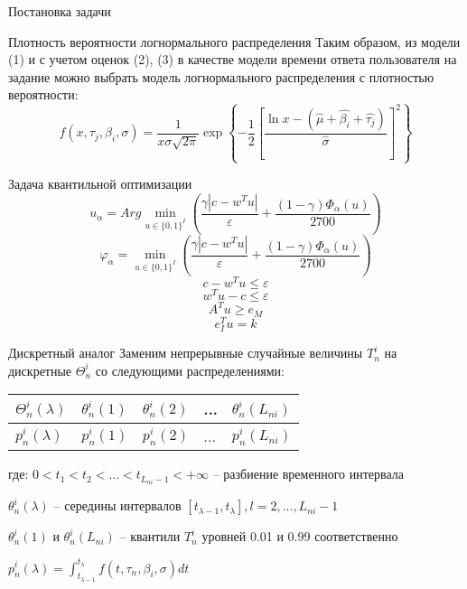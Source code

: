\documentclass[aspectratio=169]{beamer}
\begin{document}
    \begin{frame}{Постановка задачи}
        \begin{block}{Плотность вероятности логнормального распределения}
            Таким образом, из модели (1) и с учетом оценок (2), (3) в качестве модели времени ответа пользователя на задание можно выбрать модель логнормального распределения с плотностью вероятности:
            \begin{equation}
                f(x,\tau_j,\beta_i,\sigma) = \dfrac{1}{x\sigma \sqrt{2\pi}}\exp \left\{ -\dfrac{1}{2} \left[ \dfrac{\ln x - (\hat{\mu} + \hat{\beta_i} + \hat{\tau_j})}{\hat{\sigma}} \right]^2 \right\}
            \end{equation}
        \end{block}
    \end{frame}

    \begin{frame}{Задача квантильной оптимизации}
        $$u_\alpha = Arg\min_{u\in\{0, 1\}^I}\left(\frac{\gamma\left|c-w^T u\right|}{\varepsilon} + \frac{(1-\gamma)\Phi_\alpha(u)}{2700}\right)$$
        $$\varphi_\alpha = \min_{u\in\{0, 1\}^I}\left(\frac{\gamma\left|c-w^T u\right|}{\varepsilon} + \frac{(1-\gamma)\Phi_\alpha(u)}{2700}\right)$$
        $$c-w^T u\leq\varepsilon$$
        $$w^T u-c\leq\varepsilon$$
        $$A^T u\geq e_M$$
        $$e_I^T u=k$$
    \end{frame}
    
    \begin{frame}{Дискретный аналог}
        Заменим непрерывные случайные величины $T_n^i$ на дискретные $\Theta_n^i$ со следующими распределениями:\\
        
        \begin{table}[]
            \begin{tabular}{|l||l|l|l|l|}
                \hline
                $\Theta_n^i(\lambda)$ & $\theta_n^i(1)$ & $\theta_n^i(2)$ & ... & $\theta_n^i(L_{ni})$\\ \hline
                $p_n^i(\lambda)$ & $p_n^i(1)$ & $p_n^i(2)$ & ... & $p_n^i(L_{ni})$\\ \hline
            \end{tabular}
        \end{table}
        
        где:\newline
        $0 < t_1 < t_2 < ... < t_{L_{ni}-1} < +\infty$ -- разбиение временного интервала\newline
        
        $\theta_n^i(\lambda)$ -- середины интервалов $[t_{\lambda-1}, t_\lambda], l=2,...,L_{ni}-1$\newline
        
        $\theta_n^i(1)$ и $\theta_n^i(L_{ni})$ -- квантили $T_n^i$ уровней 0.01 и 0.99 соответственно\newline
        
        $p_n^i(\lambda)=\int_{t_{\lambda-1}}^{t_\lambda}f(t, \tau_n, \beta_i, \sigma)dt$
    \end{frame}
    
\end{document}
